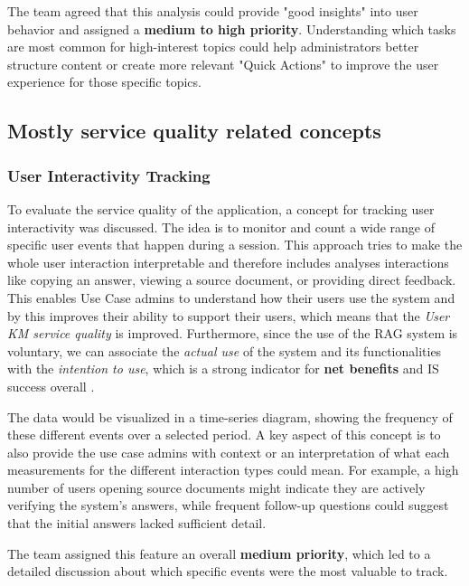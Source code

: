 \documentclass[
	english,
	ruledheaders=section,%
	class=report,%
	thesis={type=bachelor},%
	accentcolor=1b,%
	custommargins=true,%
	marginpar=false,%
	parskip=half-,%
	fontsize=11pt,%
	DIV=14,
]{tudapub}
\begin{document}
The team agreed that this analysis could provide "good insights" into user behavior and assigned a \textbf{medium to high priority}. Understanding which tasks are most common for high-interest topics could help administrators better structure content or create more relevant "Quick Actions" to improve the user experience for those specific topics.
\subsection{Mostly service quality related concepts}
\subsubsection{User Interactivity Tracking}
To evaluate the service quality \parencite[p.~18]{DeloneMcLean2003ISSuccessTenYearUpdate} of the application, a concept for tracking user interactivity was discussed. The idea is to monitor and count a wide range of specific user events that happen during a session. This approach tries to make the whole user interaction interpretable and therefore includes analyses interactions like copying an answer, viewing a source document, or providing direct feedback. This enables Use Case admins to understand how their users use the system and by this improves their ability to support their users, which means that the \textit{User KM service quality} \parencite[pp.~58--59]{DeloneMcLean2003ISSuccessTenYearUpdate} is improved. Furthermore, since the use of the RAG system is voluntary, we can associate the \textit{actual use} of the system and its functionalities with the \textit{intention to use}, which is a strong indicator for \textbf{net benefits} and IS success overall \parencite[p.~66]{DeloneMcLean1992ISSuccess}.

The data would be visualized in a time-series diagram, showing the frequency of these different events over a selected period. A key aspect of this concept is to also provide the use case admins with context or an interpretation of what each measurements for the different interaction types could mean. For example, a high number of users opening source documents might indicate they are actively verifying the system's answers, while frequent follow-up questions could suggest that the initial answers lacked sufficient detail.

The team assigned this feature an overall \textbf{medium priority}, which led to a detailed discussion about which specific events were the most valuable to track.
\end{document}
